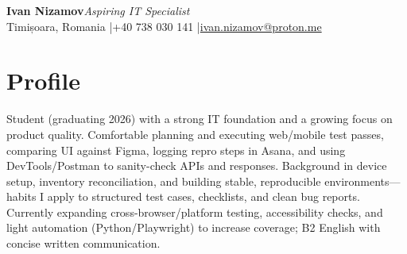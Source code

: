 \documentclass[10pt,a4paper]{article}
\begin{document}
\begin{minipage}[t]{0.75\textwidth}
\vspace{0pt}
{\LARGE \textbf{Ivan Nizamov}}\hfill \textit{Aspiring IT Specialist}\\
Timișoara, Romania \quad|\quad +40 738 030 141 \quad|\quad \href{mailto:ivan.nizamov@proton.me}{ivan.nizamov@proton.me}
\end{minipage}
\hfill
\begin{minipage}[t]{0.22\textwidth}
\vspace{0pt}
\begin{center}
\end{center}
\end{minipage}

\section*{Profile}
Student (graduating 2026) with a strong IT foundation and a growing focus on product quality. Comfortable planning and executing web/mobile test passes, comparing UI against Figma, logging repro steps in Asana, and using DevTools/Postman to sanity-check APIs and responses. Background in device setup, inventory reconciliation, and building stable, reproducible environments—habits I apply to structured test cases, checklists, and clean bug reports. Currently expanding cross-browser/platform testing, accessibility checks, and light automation (Python/Playwright) to increase coverage; B2 English with concise written communication.
\end{document}
